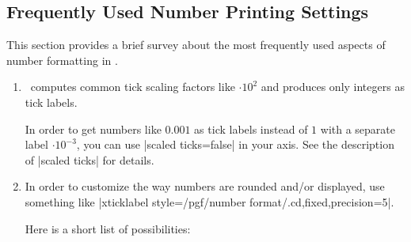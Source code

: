 \subsection{Frequently Used Number Printing Settings}
\label{sec:number:faq}
This section provides a brief survey about the most frequently used aspects of number formatting in \PGFPlots. 
\begin{enumerate}
	\item \PGFPlots\ computes common tick scaling factors like $\cdot 10^2$ and produces only integers as tick labels.
	
	In order to get numbers like $0.001$ as tick labels instead of $1$ with a separate label $\cdot 10^{-3}$, you can use |scaled ticks=false| in your axis. See the description of |scaled ticks| for details.

	\item In order to customize the way numbers are rounded and/or displayed,
	use something like |xticklabel style={/pgf/number format/.cd,fixed,precision=5}|. 
	
	Here is a short list of possibilities:
\begin{codeexample}[]
\end{codeexample}
\begin{codeexample}[]
\end{codeexample}

\begin{codeexample}[]
\end{codeexample}

\begin{codeexample}[]
\end{codeexample}

\begin{codeexample}[]
\end{codeexample}

\begin{codeexample}[]
\end{codeexample}

\begin{codeexample}[]
\end{codeexample}

\begin{codeexample}[]
\end{codeexample}


\end{enumerate}
